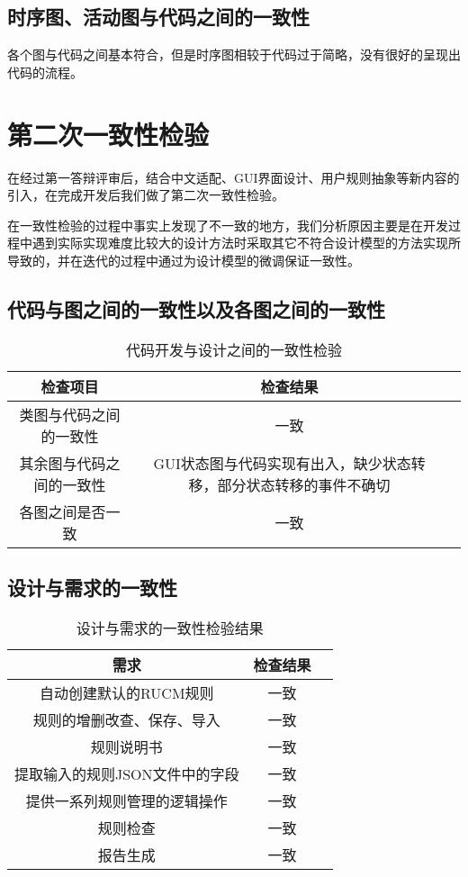 \subsection{时序图、活动图与代码之间的一致性}
各个图与代码之间基本符合，但是时序图相较于代码过于简略，没有很好的呈现出代码的流程。


\section{第二次一致性检验}
在经过第一答辩评审后，结合中文适配、GUI界面设计、用户规则抽象等新内容的引入，在完成开发后我们做了第二次一致性检验。


在一致性检验的过程中事实上发现了不一致的地方，我们分析原因主要是在开发过程中遇到实际实现难度比较大的设计方法时采取其它不符合设计模型的方法实现所导致的，并在迭代的过程中通过为设计模型的微调保证一致性。

\subsection{代码与图之间的一致性以及各图之间的一致性}
\begin{table}[htbp]
	\centering
	\begin{tabular}{|c|c|l|}
		\hline
		检查项目       &    检查结果              \\ \hline
		类图与代码之间的一致性        & 一致   \\ \hline
		其余图与代码之间的一致性        &      GUI状态图与代码实现有出入，缺少状态转移，部分状态转移的事件不确切           \\ \hline
		各图之间是否一致   &   一致                    \\ \hline                     
	\end{tabular}
	\caption{代码开发与设计之间的一致性检验}
\end{table}
\subsection{设计与需求的一致性}
\begin{table}[htbp]
	\centering
	\begin{tabular}{|c|c|l|}
		\hline
		需求       &    检查结果              \\ \hline
		自动创建默认的RUCM规则        & 一致   \\ \hline
		规则的增删改查、保存、导入        &     一致       \\ \hline
		规则说明书   &   一致                    \\ \hline                    
		提取输入的规则JSON文件中的字段   &   一致                    \\ \hline   
		提供一系列规则管理的逻辑操作   &   一致                    \\ \hline   
		规则检查   &   一致                    \\ \hline   
		报告生成   &   一致                    \\ \hline   
	\end{tabular}
	\caption{设计与需求的一致性检验结果}
\end{table}
